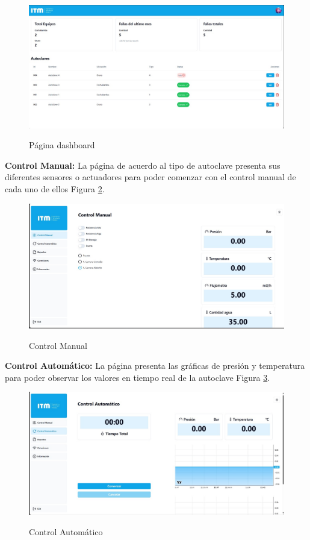 \begin{figure}[!htb]
    \centering
    \caption{Página dashboard} %
    {\includegraphics[width=0.9\columnwidth]{Figuras/6.jpg}}\\
    \label{fig:dash}
\end{figure}
\newpage
\textbf{Control Manual:} La página de acuerdo al tipo de autoclave presenta sus diferentes sensores o actuadores para poder comenzar con el control manual de cada uno de ellos Figura \ref{fig:man}.
\begin{figure}[!htb]
    \centering
    \caption{Control Manual} %
    {\includegraphics[width=0.9\columnwidth]{Figuras/8.jpg}}\\
    \label{fig:man}
\end{figure}

\textbf{Control Automático:} La página presenta las gráficas de presión y temperatura para poder observar los valores en tiempo real de la autoclave Figura \ref{fig:aut}.
\begin{figure}[!htb]
    \centering
    \caption{Control Automático} %
    {\includegraphics[width=0.9\columnwidth]{Figuras/5.jpg}}\\
    \label{fig:aut}
\end{figure}

